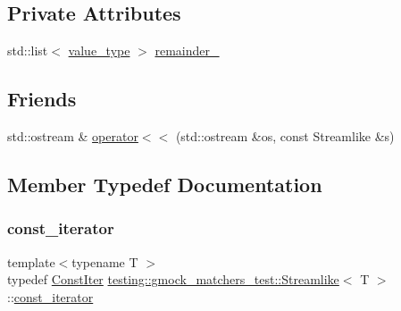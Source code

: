 \subsection*{Private Attributes}
\begin{DoxyCompactItemize}
\item 
std\+::list$<$ \mbox{\hyperlink{classtesting_1_1gmock__matchers__test_1_1_streamlike_a7e2c2e021676c1ed5dea63cdd019661c}{value\+\_\+type}} $>$ \mbox{\hyperlink{classtesting_1_1gmock__matchers__test_1_1_streamlike_a246c4e544fe6441ed7f4480370ddd97a}{remainder\+\_\+}}
\end{DoxyCompactItemize}
\subsection*{Friends}
\begin{DoxyCompactItemize}
\item 
std\+::ostream \& \mbox{\hyperlink{classtesting_1_1gmock__matchers__test_1_1_streamlike_a4b45ba8c2a5ee61697003f02568df91f}{operator$<$$<$}} (std\+::ostream \&os, const Streamlike \&s)
\end{DoxyCompactItemize}


\subsection{Member Typedef Documentation}
\mbox{\label{classtesting_1_1gmock__matchers__test_1_1_streamlike_a2eeb61dca56f70d0266f5f8ae91d2c7b}} 
\subsubsection{\texorpdfstring{const\_iterator}{const\_iterator}}
{\footnotesize\ttfamily template$<$typename T $>$ \\
typedef \mbox{\hyperlink{classtesting_1_1gmock__matchers__test_1_1_streamlike_1_1_const_iter}{Const\+Iter}} \mbox{\hyperlink{classtesting_1_1gmock__matchers__test_1_1_streamlike}{testing\+::gmock\+\_\+matchers\+\_\+test\+::\+Streamlike}}$<$ T $>$\+::\mbox{\hyperlink{classtesting_1_1gmock__matchers__test_1_1_streamlike_a2eeb61dca56f70d0266f5f8ae91d2c7b}{const\+\_\+iterator}}}

